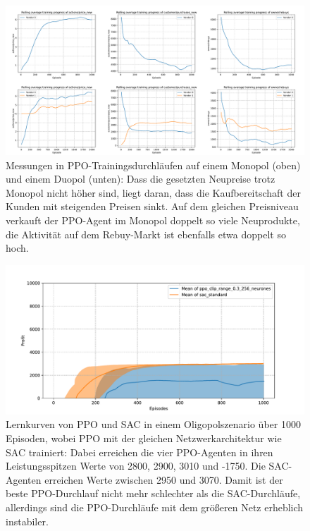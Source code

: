 \begin{figure}[htb]
	\centering
	\includegraphics[width=\textwidth]{appendix/ppo_monopoly_vs_doupoly.pdf}
	\caption{
		Messungen in PPO-Trainingsdurchläufen auf einem Monopol (oben) und einem Duopol (unten):
		Dass die gesetzten Neupreise trotz Monopol nicht höher sind, liegt daran, dass die Kaufbereitschaft der Kunden mit steigenden Preisen sinkt.
		Auf dem gleichen Preisniveau verkauft der PPO-Agent im Monopol doppelt so viele Neuprodukte, die Aktivität auf dem Rebuy-Markt ist ebenfalls etwa doppelt so hoch.
	}
	\label{graphic:PPOMonopolyDuopoly}
\end{figure}
\begin{figure}[htb]
	\centering
	\includegraphics[width=\textwidth]{appendix/comparison_oligopoly_big_network.pdf}
	\caption{
		Lernkurven von PPO und SAC in einem Oligopolszenario über 1000 Episoden, wobei PPO mit der gleichen Netzwerkarchitektur wie SAC trainiert:
		Dabei erreichen die vier PPO-Agenten in ihren Leistungsspitzen Werte von 2800, 2900, 3010 und -1750.
		Die SAC-Agenten erreichen Werte zwischen 2950 und 3070.
		Damit ist der beste PPO-Durchlauf nicht mehr schlechter als die SAC-Durchläufe, allerdings sind die PPO-Durchläufe mit dem größeren Netz erheblich instabiler.
	}
	\label{graphic:OligopolyMixedComparisonBigNetwork}
\end{figure}
